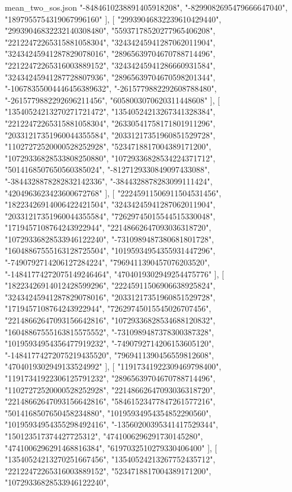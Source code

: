 \begin{filecontents*}[overwrite]{mean_two_sos.json}
    "-8484610238891405918208",
    "-8299082695479666647040",
    "1897955754319067996160"
   ],
   [
    "29939046832239610429440",
    "29939046832232140308480",
    "55937178520277965406208",
    "22122472265315881058304",
    "32434245941287062011904",
    "32434245941287829078016",
    "28965639704670788714496",
    "22122472265316003889152",
    "32434245941286660931584",
    "32434245941287728807936",
    "28965639704670598201344",
    "-10678355004446456389632",
    "-2615779882292608788480",
    "-2615779882292696211456",
    "6058003070620311448608"
   ],
   [
    "13540524213270271721472",
    "13540524213267341328384",
    "22122472265315881058304",
    "26330541758171801911296",
    "20331217351960044355584",
    "20331217351960851529728",
    "11027272520000528252928",
    "5234718817004389171200",
    "10729336828533808250880",
    "10729336828534224371712",
    "5014168507650560385024",
    "-8127129330849097433088",
    "-3844328878282832142336",
    "-3844328878283099111424",
    "4204963623423600672768"
   ],
   [
    "22245911506911504531456",
    "18223426914006422421504",
    "32434245941287062011904",
    "20331217351960044355584",
    "72629745015544515330048",
    "1719457108764243922944",
    "22148662647093036318720",
    "10729336828533946122240",
    "-7310989487380681801728",
    "16048867555163128725504",
    "10195934954355931447296",
    "-7490792714206127284224",
    "7969411390457076203520",
    "-14841774272075149246464",
    "4704019302949254475776"
   ],
   [
    "18223426914012428599296",
    "22245911506906638925824",
    "32434245941287829078016",
    "20331217351960851529728",
    "1719457108764243922944",
    "72629745015545026707456",
    "22148662647093156642816",
    "10729336828534688120832",
    "16048867555163815575552",
    "-7310989487378300387328",
    "10195934954356477919232",
    "-7490792714206153605120",
    "-14841774272075219435520",
    "7969411390456559812608",
    "4704019302949133524992"
   ],
   [
    "11917341922309469798400",
    "11917341922306125791232",
    "28965639704670788714496",
    "11027272520000528252928",
    "22148662647093036318720",
    "22148662647093156642816",
    "58461523477847261577216",
    "5014168507650458234880",
    "10195934954354852290560",
    "10195934954355298492416",
    "-13560200395341417529344",
    "150123517374427725312",
    "4741006296291730145280",
    "4741006296291468816384",
    "6197032510279330406400"
   ],
   [
    "13540524213270251667456",
    "13540524213267752435712",
    "22122472265316003889152",
    "5234718817004389171200",
    "10729336828533946122240",

\end{filecontents*}

